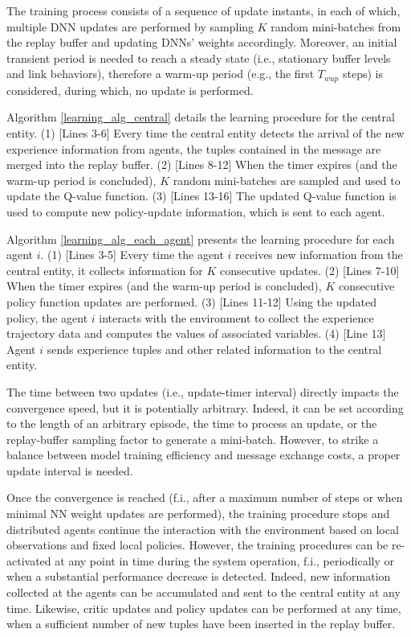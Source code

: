 The training process consists of a sequence of update instants, in each of which, multiple DNN updates are performed by sampling $K$ random mini-batches from the replay buffer and updating DNNs' weights accordingly. Moreover, an initial transient period is needed to reach a steady state (i.e., stationary buffer levels and link behaviors), therefore a warm-up period (e.g., the first $T_{wup}$ steps) is considered, during which, no update is performed.

Algorithm \ref{learning_alg_central} details the learning procedure for the central entity. 
(1) [Lines 3-6] Every time the central entity detects the arrival of the new experience information from agents, the tuples contained in the message are merged into the replay buffer. 
(2) [Lines 8-12] When the timer expires (and the warm-up period is concluded), $K$ random mini-batches are sampled and used to update the Q-value function. 
(3) [Lines 13-16] The updated Q-value function is used to compute new policy-update information, which is sent to each agent. 

Algorithm \ref{learning_alg_each_agent} presents the learning procedure for each agent $i$. 
(1) [Lines 3-5] Every time the agent $i$ receives new information from the central entity, it collects information for $K$ consecutive updates.
(2) [Lines 7-10] When the timer expires (and the warm-up period is concluded), $K$ consecutive policy function updates are performed.
(3) [Lines 11-12] Using the updated policy, the agent $i$ interacts with the environment to collect the experience trajectory data and computes the values of associated variables.  
(4) [Line 13] Agent $i$ sends experience tuples and other related information to the central entity.

The time between two updates (i.e., update-timer interval) directly impacts the convergence speed, but it is potentially arbitrary. Indeed, it can be set according to the length of an arbitrary episode, the time to process an update, or the replay-buffer sampling factor to generate a mini-batch. However, to strike a balance between model training efficiency and message exchange costs, a proper update interval is needed.

Once the convergence is reached (f.i., after a maximum number of steps or when minimal NN weight updates are performed), the training procedure stops and distributed agents continue the interaction with the environment based on local observations and fixed local policies. However, the training procedures can be re-activated at any point in time during the system operation, f.i., periodically or when a substantial performance decrease is detected. Indeed, new information collected at the agents can be accumulated and sent to the central entity at any time. Likewise, critic updates and policy updates can be performed at any time, when a sufficient number of new tuples have been inserted in the replay buffer.

